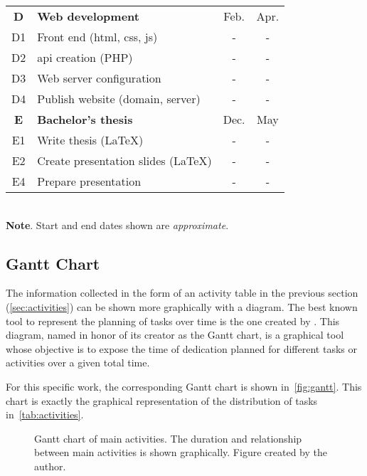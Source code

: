 \begin{table}[p]
\begin{tabular}{cp{}cc}
    \textbf{D} & \textbf{Web development}                    & Feb. & Apr. \\
    D1         & Front end (\acs{html}, \acs{css}, \acs{js}) & -    & -    \\
    D2         & \Acs{api} creation (PHP)                    & -    & -    \\
    D3         & Web server configuration                    & -    & -    \\
    D4         & Publish website (domain, server)            & -    & -    \\
    \midrule

    \rowcolor{rowColor}
    \textbf{E}             & \textbf{Bachelor's thesis}          & Dec. & May \\
    \rowcolor{rowColor}
    E1                     & Write thesis (\LaTeX)               & -    & -   \\
    \rowcolor{rowColor}
    E2                     & Create presentation slides (\LaTeX) & -    & -   \\
    \rowcolor{rowColor} E4 & Prepare presentation                & -    & -   \\
    \bottomrule
  \end{tabular}\\[1.25ex]
  {\small\textbf{Note}. Start and end dates shown are \emph{approximate}.}
\end{table}


\subsection{Gantt Chart}\label{sec:gantt}

The information collected in the form of an activity table in the previous
section (\vref{sec:activities}) can be shown more graphically with a
diagram. The best known tool to represent the planning of tasks over time is
the one created by . This
diagram, named in honor of its creator as the Gantt chart, is a graphical tool
whose objective is to expose the time of dedication planned for different tasks
or activities over a given total time.

For this specific work, the corresponding Gantt chart is shown in\
\vref{fig:gantt}. This chart is exactly the graphical representation of the
distribution of tasks in\ \vref{tab:activities}.

\begin{figure}[ht]
  \centering
  
  \vspace{-.6cm} %
  \caption[Gantt chart of main activities]{Gantt chart of main activities. The
    duration and relationship between main activities is shown
    graphically. Figure created by the author.}%
  \label{fig:gantt}
\end{figure}



